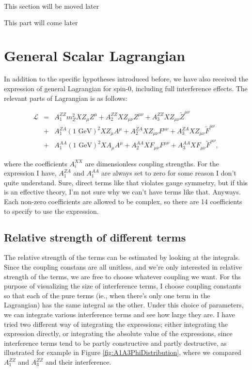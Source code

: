 \documentclass{cmspaper}
\begin{document}
This section will be moved later

This part will come later

\section{General Scalar Lagrangian}

In addition to the specific hypotheses introduced before, we have also received the expression of general
Lagrangian for spin-0, including full interference effects.  The relevant parts of Lagrangian is as follows:

\begin{eqnarray}
\mathcal{L} &=& A_1^{ZZ} m_Z^2 X Z_\mu Z^\mu + A_2^{ZZ} X Z_{\mu\nu} Z^{\mu\nu} + A_3^{ZZ} X Z_{\mu\nu} \tilde{Z}^{\mu\nu} \nonumber\\
   &+& A_1^{ZA} (\textrm{1 GeV})^2 X Z_\mu A^\mu + A_2^{ZA} X Z_{\mu\nu} F^{\mu\nu} + A_3^{ZA} X Z_{\mu\nu} \tilde{F}^{\mu\nu} \nonumber\\
   &+& A_1^{AA} (\textrm{1 GeV})^2 X A_\mu A^\mu + A_2^{AA} X F_{\mu\nu} F^{\mu\nu} + A_3^{AA} X F_{\mu\nu} \tilde{F}^{\mu\nu},
\end{eqnarray}

where the coefficients $A_i^{XX}$ are dimensionless coupling strengths.  For the expression I have, $A_1^{ZA}$ and
$A_1^{AA}$ are always set to zero for some reason I don't quite understand.  Sure, direct terms like that violates
gauge symmetry, but if this is an effective theory, I'm not sure why we can't have terms like that.  Anyways.
Each non-zero coefficients are allowed to be complex, so there are 14 coefficients to specify to use the expression.

\subsection{Relative strength of different terms}

The relative strength of the terms can be estimated by looking at the integrals.  Since the coupling constans are all
unitless, and we're only interested in relative strength of the terms, we are free to choose whatever coupling we want.
For ths purpose of visualizing the size of interference terms, I choose coupling constants so that each of the
pure terms (ie., when there's only one term in the Lagrangian) has the same integral as the other.  Under this choice
of parameters, we can integrate various interference terms and see how large they are.  I have tried two different
way of integrating the expressions; either integrating the expression directly, or integrating the absolute value
of the expressions, since interference terms tend to be partly constructive and partly destructive, as illustrated for
example in Figure \ref{fig:A1A3PhiDistribution}, where we compared $A_1^{ZZ}$ and $A_3^{ZZ}$ and their interference.
\end{document}
